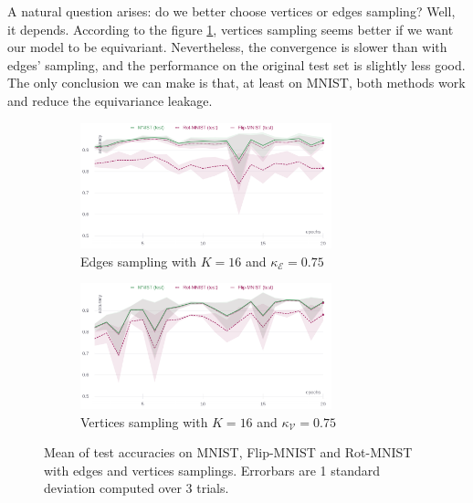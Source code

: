 \documentclass{article}
\begin{document}
A natural question arises: do we better choose vertices or edges sampling? Well, it depends. According to the figure \ref{fig:sampling_results}, vertices sampling seems better if we want our model to be equivariant. Nevertheless, the convergence is slower than with edges' sampling, and the performance on the original test set is slightly less good. The only conclusion we can make is that, at least on MNIST, both methods work and reduce the equivariance leakage.

\begin{figure}[h!] 
    \centering
    \begin{subfigure}[b]{\textwidth}
        \centering
        \includegraphics[width=0.8\textwidth]{Images/training_w_edge_sampling.png}
        \caption{Edges sampling with $K=16$ and $\kappa_{\mathcal{E}} = 0.75$}
    \end{subfigure}
    \hfill
    \begin{subfigure}[b]{\textwidth}
        \centering
        \includegraphics[width=0.8\textwidth]{Images/training_w_node_sampling.png}
        \caption{Vertices sampling with $K=16$ and $\kappa_{\mathcal{V}} = 0.75$}
    \end{subfigure}
    \caption{Mean of test accuracies on MNIST, Flip-MNIST and Rot-MNIST with edges and vertices samplings. Errorbars are 1 standard deviation computed over 3 trials.}
    \label{fig:sampling_results}
\end{figure}
\end{document}
